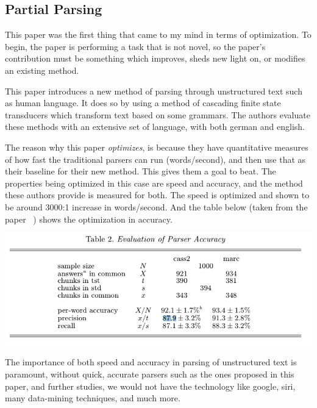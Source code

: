 \documentclass{article}
\numberwithin{equation}{section} %
\numberwithin{figure}{section} %
\numberwithin{table}{section} %
\begin{document}
\subsection{Partial Parsing}
This paper was the first thing that came to my mind in terms of optimization.  To begin, the paper is performing a task that is not novel, so the paper's contribution must be something which improves, sheds new light on, or modifies an existing method.  

This paper introduces a new method of parsing through unstructured text such as human language.  It does so by using a method of cascading finite state transducers which transform text based on some grammars.  The authors evaluate these methods with an extensive set of language, with both german and english.  

The reason why this paper \textit{optimizes}, is because they have quantitative measures of how fast the traditional parsers can run (words/second), and then use that as their baseline for their new method.  This gives them a goal to beat.  The properties being optimized in this case are speed and accuracy, and the method these authors provide is measured for both.  The speed is optimized and shown to be around 3000:1 increase in words/second.  And the table below (taken from the paper ~\cite{Abney:1996:PPV:974697.974705}) shows the optimization in accuracy. 

\begin{center}
  \includegraphics[width=\textwidth]{partialaccuracy}
\end{center}

The importance of both speed and accuracy in parsing of unstructured text is paramount, without quick, accurate parsers such as the ones proposed in this paper, and further studies, we would not have the technology like google, siri, many data-mining techniques, and much more.

\subsection{}
\end{document}
